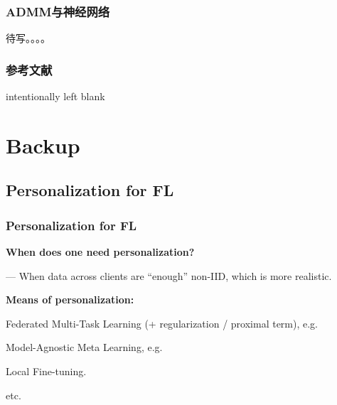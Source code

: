 
\begin{frame}
\frametitle{ADMM与神经网络}

待写。。。。

\end{frame}




\begin{frame}[allowframebreaks]
\frametitle{参考文献}

{\footnotesize


}

\end{frame}


\begin{frame}

{\tiny intentionally left blank}

\end{frame}


\section[Backup]{Backup}

\subsection[PerFL]{Personalization for FL}


\begin{frame}
\frametitle{Personalization for FL}

{\bfseries When does one need personalization?}

\vspace{0.2em}
\noindent --- When data across clients are ``enough'' non-IID, which is more realistic.

\pause
\vspace{0.8em}

{\bfseries Means of personalization:}
\begin{itemize}
    \item Federated Multi-Task Learning (+ regularization / proximal term), e.g. \cite{smith2017mocha}
    {
    \item Model-Agnostic Meta Learning, e.g. \cite{finn2017maml}
    \item Local Fine-tuning.
    \item etc.}
\end{itemize}

\end{frame}

